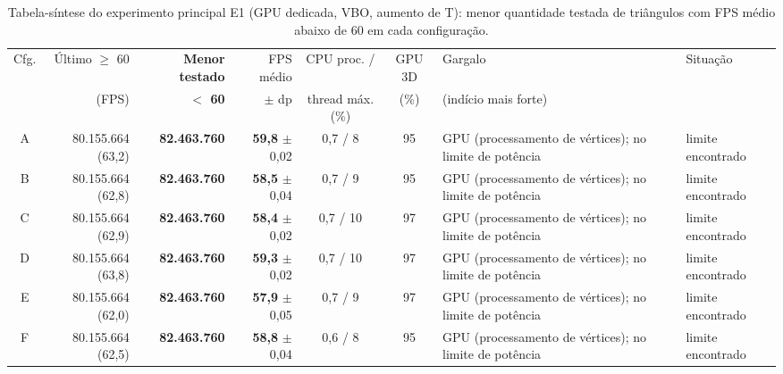 \begin{table}[H]
\centering
\caption{Tabela-síntese do experimento principal E1 (GPU dedicada, VBO, aumento de T): menor quantidade testada de triângulos com FPS médio abaixo de 60 em cada configuração.}
\label{tab:sintese_e1}
\scriptsize
\setlength{\tabcolsep}{3pt}
\begin{tabularx}{\textwidth}{c r r r c c L P{1.6cm}}
\toprule
Cfg. & Último $\geq$ 60 & \textbf{Menor testado} & FPS médio & CPU proc. / & GPU 3D & Gargalo & Situação \\
 & (FPS) & \textbf{$<$ 60} & $\pm$ dp & thread máx. (\%) & (\%) & (indício mais forte) & \\
\midrule
A & 80.155.664 (63,2) & \textbf{82.463.760} & \textbf{59,8} $\pm$ 0,02 & 0,7 / 8 & 95 & GPU (processamento de vértices); no limite de potência & limite encontrado \\
B & 80.155.664 (62,8) & \textbf{82.463.760} & \textbf{58,5} $\pm$ 0,04 & 0,7 / 9 & 95 & GPU (processamento de vértices); no limite de potência & limite encontrado \\
C & 80.155.664 (62,9) & \textbf{82.463.760} & \textbf{58,4} $\pm$ 0,02 & 0,7 / 10 & 97 & GPU (processamento de vértices); no limite de potência & limite encontrado \\
D & 80.155.664 (63,8) & \textbf{82.463.760} & \textbf{59,3} $\pm$ 0,02 & 0,7 / 10 & 97 & GPU (processamento de vértices); no limite de potência & limite encontrado \\
E & 80.155.664 (62,0) & \textbf{82.463.760} & \textbf{57,9} $\pm$ 0,05 & 0,7 / 9 & 97 & GPU (processamento de vértices); no limite de potência & limite encontrado \\
F & 80.155.664 (62,5) & \textbf{82.463.760} & \textbf{58,8} $\pm$ 0,04 & 0,6 / 8 & 95 & GPU (processamento de vértices); no limite de potência & limite encontrado \\
\bottomrule
\end{tabularx}
\end{table}

